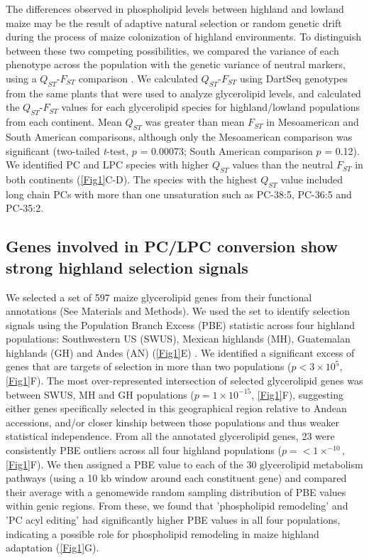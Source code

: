 \documentclass[9pt,twocolumn,twoside,lineno]{biorxiv}
\begin{document}
The differences observed in phospholipid levels between highland and lowland maize may be the result of adaptive natural selection or random genetic drift during the process of maize colonization of highland environments.
To distinguish between these two competing possibilities, we compared the variance of each phenotype across the population with the genetic variance of neutral markers, using a $Q_{ST}$-$F_{ST}$ comparison \cite{Leinonen2013-ic}.
We calculated $Q_{ST}$-$F_{ST}$ using DartSeq genotypes \cite{Janzen2021-lz} from the same plants that were used to analyze glycerolipid levels, and calculated the $Q_{ST}$-$F_{ST}$ values for each glycerolipid species for highland/lowland populations from each continent. 
Mean $Q_{ST}$ was greater than mean $F_{ST}$ in Mesoamerican and South American comparisons, although only the Mesoamerican comparison was significant (two-tailed \textit{t}-test, $p$ = 0.00073; South American comparison $p$ = 0.12).
We identified PC and LPC species with higher $Q_{ST}$ values than the neutral $F_{ST}$ in both continents  (\cref{Fig1}C-D).
The species with the highest $Q_{ST}$ value included long chain PCs with more than one unsaturation such as PC-38:5, PC-36:5 and PC-35:2.

\subsection{Genes involved in PC/LPC conversion show strong highland selection signals} 
We selected a set of 597 maize glycerolipid genes from their functional annotations (See Materials and Methods). 
We used the set to identify selection signals using the Population Branch Excess (PBE) \cite{Pool2017-oa} statistic across four highland populations: Southwestern US (SWUS), Mexican highlands (MH), Guatemalan highlands (GH) and Andes (AN) (\cref{Fig1}E) \cite{Wang2020-mp}. 
We identified a significant excess of genes that are targets of selection in more than two populations ($ p< 3 \times 10^{5}$, \ref{Fig1}F).
The most over-represented intersection of selected glycerolipid genes was between SWUS, MH and GH populations ($p = 1  \times 10 ^{-15} $, \cref{Fig1}F), suggesting either genes specifically selected in this geographical region relative to Andean accessions, and/or closer kinship between those populations and thus weaker statistical independence.
From all the annotated glycerolipid genes, 23 were consistently PBE outliers across all four highland populations ($p =<1  \times  ^{-10}$, \cref{Fig1}F).
We then assigned a PBE value to each of the 30 glycerolipid metabolism pathways (using a 10 kb window around each constituent gene)  and compared their average with a genomewide random sampling distribution of PBE values within genic regions. 
From these, we found that 'phospholipid remodeling' and 'PC acyl editing' had significantly higher PBE values in all four populations, indicating a possible role for phospholipid remodeling in maize highland adaptation
(\cref{Fig1}G). 
\end{document}
